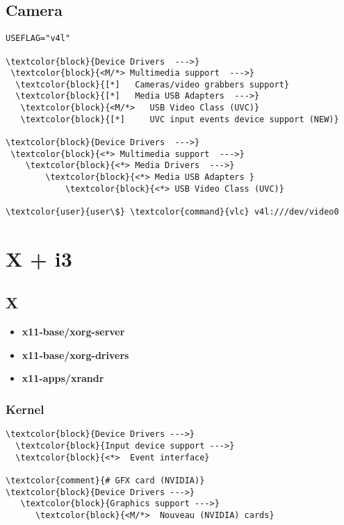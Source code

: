 \documentclass[10pt, a4paper, onecolumn, openany]{book}         %
\begin{document}
\section{Camera}
\begin{Verbatim}[commandchars=\\\{\}]
USEFLAG="v4l"

\textcolor{block}{Device Drivers  --->}
 \textcolor{block}{<M/*> Multimedia support  --->}
  \textcolor{block}{[*]   Cameras/video grabbers support}
  \textcolor{block}{[*]   Media USB Adapters  --->}
   \textcolor{block}{<M/*>   USB Video Class (UVC)}  
   \textcolor{block}{[*]     UVC input events device support (NEW)}

\textcolor{block}{Device Drivers  --->}
 \textcolor{block}{<*> Multimedia support  --->}
    \textcolor{block}{<*> Media Drivers  --->}
        \textcolor{block}{<*> Media USB Adapters }
            \textcolor{block}{<*> USB Video Class (UVC)}

\textcolor{user}{user\$} \textcolor{command}{vlc} v4l:///dev/video0 
\end{Verbatim}   
   

\chapter{X + i3}
\section{X}
\begin{itemize}
    \item \textbf{x11-base/xorg-server}
    \item \textbf{x11-base/xorg-drivers}
    \item \textbf{x11-apps/xrandr}
\end{itemize}

\subsection{Kernel}
\begin{Verbatim}[commandchars=\\\{\}]
\textcolor{block}{Device Drivers --->}
  \textcolor{block}{Input device support --->}
  \textcolor{block}{<*>  Event interface}
  
\textcolor{comment}{# GFX card (NVIDIA)}
\textcolor{block}{Device Drivers --->}
   \textcolor{block}{Graphics support --->}
      \textcolor{block}{<M/*>  Nouveau (NVIDIA) cards}
\end{Verbatim}
\end{document}
